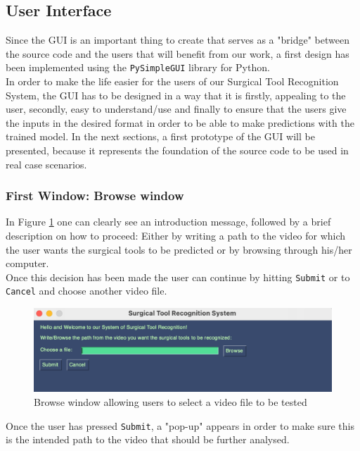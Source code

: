 \documentclass{article}
\begin{document}
\subsection{User Interface}
Since the GUI is an important thing to create that serves as a "bridge" between the source code and the users that will benefit from our work, a first design has been implemented using the \texttt{PySimpleGUI} library for Python.\\
\noindent
In order to make the life easier for the users of our Surgical Tool Recognition System, the GUI has to be designed in a way that it is firstly, appealing to the user, secondly, easy to understand/use and finally to ensure that the users give the inputs in the desired format in order to be able to make predictions with the trained model.
\noindent
In the next sections, a first prototype of the GUI will be presented, because it represents the foundation of the source code to be used in real case scenarios.

\subsubsection{First Window: Browse window}
In Figure \ref{fig:browse} one can clearly see an introduction message, followed by a brief description on how to proceed:
Either by writing a path to the video for which the user wants the surgical tools to be predicted or by browsing through his/her computer. \\
\noindent
Once this decision has been made the user can continue by hitting \texttt{Submit} or to \texttt{Cancel} and choose another video file.

\begin{figure}[H]
    \centering
    \includegraphics[width = \linewidth]{Browse_window.png}
    \caption{Browse window allowing users to select a video file to be tested}
    \label{fig:browse}
\end{figure}
\noindent
Once the user has pressed \texttt{Submit}, a "pop-up" appears in order to make sure this is the intended path to the video that should be further analysed. 
\end{document}
